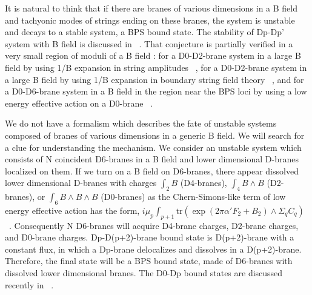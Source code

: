 \documentclass[a4paper,12pt]{article}
\newcommand{\tr}{\mbox{tr}}
\begin{document}
 It is natural to think that if there are branes of various dimensions in a B field and tachyonic modes of strings ending on these branes, the system is unstable and decays to a stable system, a BPS bound state. The stability of Dp-Dp' system with B field is discussed in ~\cite{p-p'}. That conjecture is partially verified in a very small region of moduli of a B field : for a D0-D2-brane system in a large B field by using 1/B expansion in string amplitudes ~\cite{narain}, for a D0-D2-brane system in a large B field by using 1/B expansion in boundary string field theory ~\cite{david}, and for a D0-D6-brane system in a B field in the region near the BPS loci by using a low energy effective action on a D0-brane ~\cite{park, witten}. 
 
 We do not have a formalism which describes the fate of unstable systems composed of branes of various dimensions in a generic B field. We will search for a clue for understanding the mechanism. We consider an unstable system which consists of N coincident D6-branes in a B field and lower dimensional D-branes localized on them. If we turn on a B field on D6-branes, there appear dissolved lower dimensional D-branes with charges $ \int_2 B $ (D4-branes), $\int_4 B \wedge B $ (D2-branes), or $ \int_6 B \wedge B \wedge B $ (D0-branes) as the Chern-Simons-like term of low energy effective action has the form, $i \mu_p \int_{p+1} \tr(\exp(2 \pi \alpha'F_2 + B_2) \wedge \Sigma_q C_q)$ ~\cite{instanton, within, jabbari0-2}. Consequently N D6-branes will acquire D4-brane charges, D2-brane charges, and D0-brane charges. Dp-D(p+2)-brane bound state is D(p+2)-brane with a constant flux, in which a Dp-brane delocalizes and dissolves in a D(p+2)-brane. Therefore, the final state will be a BPS bound state, made of D6-branes with dissolved lower dimensional branes. The D0-Dp bound states are discussed recently in ~\cite{p-cycle, ohta}.
 
\end{document}
